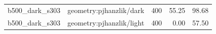 \begin{longtable}{l>{\raggedright\arraybackslash}p{.42\linewidth}rrr}
b500\_\allowbreak{}dark\_\allowbreak{}s303 & %
geometry:pjhanzlik/dark & %
400 & %
55.25 & %
98.68 \\ %

b500\_\allowbreak{}dark\_\allowbreak{}s303 & %
geometry:pjhanzlik/light & %
400 & %
0.00 & %
57.50 \\ %


\end{longtable}
